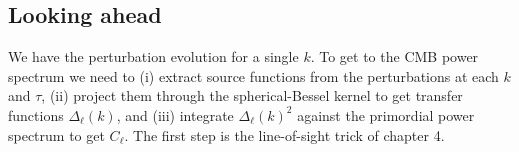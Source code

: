 \subsection{Looking ahead}

We have the perturbation evolution for a single $k$. To get to the CMB power spectrum we need to (i) extract source functions from the perturbations at each $k$ and $\tau$, (ii) project them through the spherical-Bessel kernel to get transfer functions $\Delta_\ell(k)$, and (iii) integrate $\Delta_\ell(k)^2$ against the primordial power spectrum to get $C_\ell$. The first step is the line-of-sight trick of chapter 4.
